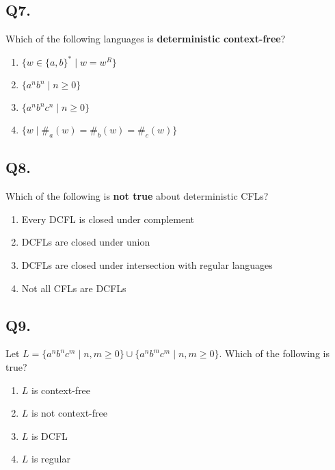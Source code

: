 \vspace{1em}

\subsection*{Q7.}
Which of the following languages is \textbf{deterministic context-free}?

\begin{enumerate}[label=(\alph*)]
    \item $\{w \in \{a,b\}^* \mid w = w^R \}$  
    \item $\{a^n b^n \mid n \geq 0\}$  
    \item $\{a^n b^n c^n \mid n \geq 0\}$  
    \item $\{w \mid \#_a(w) = \#_b(w) = \#_c(w)\}$  
\end{enumerate}

\vspace{1em}

\subsection*{Q8.}
Which of the following is \textbf{not true} about deterministic CFLs?

\begin{enumerate}[label=(\alph*)]
    \item Every DCFL is closed under complement  
    \item DCFLs are closed under union  
    \item DCFLs are closed under intersection with regular languages  
    \item Not all CFLs are DCFLs  
\end{enumerate}

\vspace{1em}

\subsection*{Q9.}
Let $L = \{ a^n b^n c^m \mid n, m \geq 0 \} \cup \{ a^n b^m c^m \mid n, m \geq 0 \}$. Which of the following is true?

\begin{enumerate}[label=(\alph*)]
    \item $L$ is context-free  
    \item $L$ is not context-free  
    \item $L$ is DCFL  
    \item $L$ is regular  
\end{enumerate}

